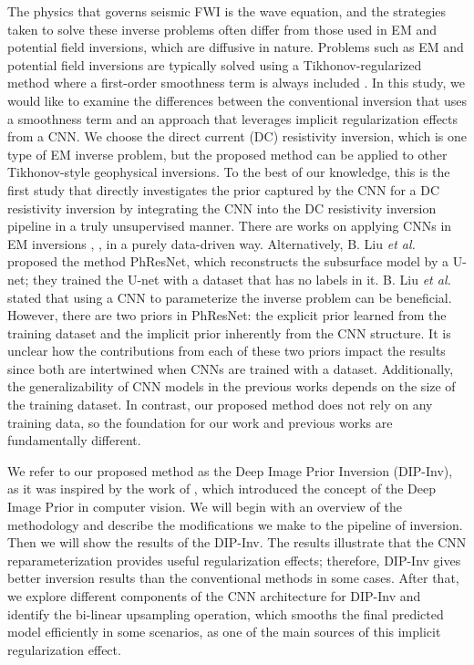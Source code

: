 \documentclass[lettersize,journal]{IEEEtran}
\begin{document}
The physics that governs seismic FWI is the wave equation, and the strategies taken to solve these inverse problems often differ from those used in EM and potential field inversions, which are diffusive in nature. Problems such as EM and potential field inversions are typically solved using a Tikhonov-regularized method where a first-order smoothness term is always included \cite{ref47}. 
In this study, we would like to examine the differences between the conventional inversion that uses a smoothness term and an approach that leverages implicit regularization effects from a CNN. 
We choose the direct current (DC) resistivity inversion, which is one type of EM inverse problem, but the proposed method can be applied to other Tikhonov-style geophysical inversions. To the best of our knowledge, this is the first study that directly investigates the prior captured by the CNN for a DC resistivity inversion by integrating the CNN into the DC resistivity inversion pipeline in a truly unsupervised manner. There are works on applying CNNs in EM inversions \cite{ref43}, \cite{ref44}, \cite{ref45} in a purely data-driven way. Alternatively, B. Liu \textit{et al.} \cite{ref9} proposed the method PhResNet, which reconstructs the subsurface model by a U-net; they trained the U-net with a dataset that has no labels in it.
B. Liu \textit{et al.} \cite{ref9} stated that using a CNN to parameterize the inverse problem can be beneficial. However, there are two priors in PhResNet: the explicit prior learned from the training dataset and the implicit prior inherently from the CNN structure. It is unclear how the contributions from each of these two priors impact the results since both are intertwined when CNNs are trained with a dataset. 
Additionally, the generalizability of CNN models in the previous works depends on the size of the training dataset. In contrast, our proposed method does not rely on any training data, so the foundation for our work and previous works are fundamentally different.

We refer to our proposed method as the Deep Image Prior Inversion (DIP-Inv), as it was inspired by the work of \cite{ref20}, which introduced the concept of the Deep Image Prior in computer vision. We will begin with an overview of the methodology and describe the modifications we make to the pipeline of inversion. Then we will show the results of the DIP-Inv. The results illustrate that the CNN reparameterization provides useful regularization effects; therefore, DIP-Inv gives better inversion results than the conventional methods in some cases. After that, we explore different components of the CNN architecture for DIP-Inv and identify the bi-linear upsampling operation, which smooths the final predicted model efficiently in some scenarios, as one of the main sources of this implicit regularization effect. 
\end{document}
